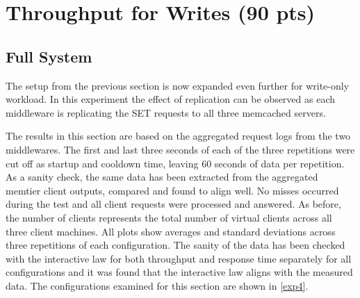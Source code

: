 \documentclass[11pt,a4paper]{article}
\begin{document}

\section{Throughput for Writes (90 pts)}

\subsection{Full System} \label{sec4}
The setup from the previous section is now expanded even further for write-only workload. In this experiment the effect of replication can be observed as each middleware is replicating the SET requests to all three memcached servers.

The results in this section are based on the aggregated request logs from the two middlewares. The first and last three seconds of each of the three repetitions were cut off as startup and cooldown time, leaving 60 seconds of data per repetition. As a sanity check, the same data has been extracted from the aggregated memtier client outputs, compared and found to align well. No misses occurred during the test and all client requests were processed and answered. As before, the number of clients represents the total number of virtual clients across all three client machines. All plots show averages and standard deviations across three repetitions of each configuration. The sanity of the data has been checked with the interactive law for both throughput and response time separately for all configurations and it was found that the interactive law aligns with the measured data. The configurations examined for this section are shown in \autoref{exp4}.
\end{document}
